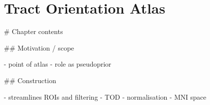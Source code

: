 \chapter{Tract Orientation Atlas}
\label{chapterlabel2}

\begin{markdown}

  # Chapter contents

  ## Motivation / scope

  - point of atlas
  - role as pseudoprior

  ## Construction

  - streamlines ROIs and filtering
  - TOD
  - normalisation
  - MNI space

\end{markdown}
